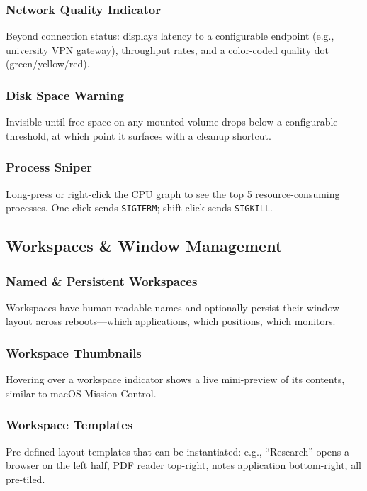\documentclass[11pt,a4paper]{article}
\begin{document}
\subsubsection{Network Quality Indicator}
Beyond connection status: displays latency to a configurable endpoint (e.g., university VPN gateway), throughput rates, and a color-coded quality dot (green/yellow/red).

\subsubsection{Disk Space Warning}
Invisible until free space on any mounted volume drops below a configurable threshold, at which point it surfaces with a cleanup shortcut.

\subsubsection{Process Sniper}
Long-press or right-click the CPU graph to see the top 5 resource-consuming processes. One click sends \texttt{SIGTERM}; shift-click sends \texttt{SIGKILL}.


\subsection{Workspaces \& Window Management}
\label{sec:features-workspaces}

\subsubsection{Named \& Persistent Workspaces}
Workspaces have human-readable names and optionally persist their window layout across reboots---which applications, which positions, which monitors.

\subsubsection{Workspace Thumbnails}
Hovering over a workspace indicator shows a live mini-preview of its contents, similar to macOS Mission Control.

\subsubsection{Workspace Templates}
Pre-defined layout templates that can be instantiated: e.g., ``Research'' opens a browser on the left half, PDF reader top-right, notes application bottom-right, all pre-tiled.
\end{document}
